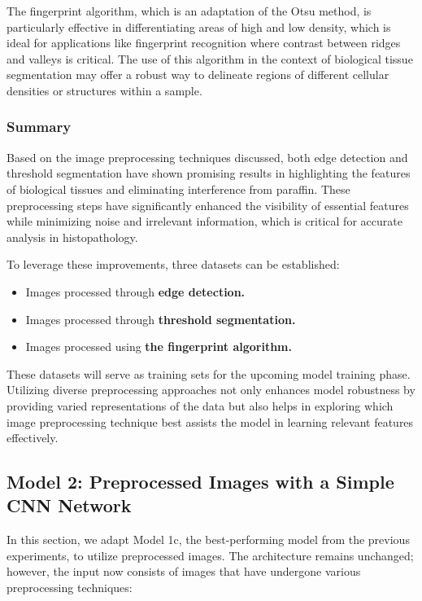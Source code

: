 The fingerprint algorithm, which is an adaptation of the Otsu method, is particularly effective in differentiating areas of high and low density, which is ideal for applications like fingerprint recognition where contrast between ridges and valleys is critical. The use of this algorithm in the context of biological tissue segmentation may offer a robust way to delineate regions of different cellular densities or structures within a sample.

\subsubsection{Summary}

Based on the image preprocessing techniques discussed, both edge detection and threshold segmentation have shown promising results in highlighting the features of biological tissues and eliminating interference from paraffin. These preprocessing steps have significantly enhanced the visibility of essential features while minimizing noise and irrelevant information, which is critical for accurate analysis in histopathology.

To leverage these improvements, three datasets can be established:

\begin{itemize}
    \item Images processed through \textbf{edge detection.}
    \item Images processed through \textbf{threshold segmentation.}
    \item Images processed using \textbf{the fingerprint algorithm.}
\end{itemize}

These datasets will serve as training sets for the upcoming model training phase. Utilizing diverse preprocessing approaches not only enhances model robustness by providing varied representations of the data but also helps in exploring which image preprocessing technique best assists the model in learning relevant features effectively.
\FloatBarrier



\subsection{Model 2: Preprocessed Images with a Simple CNN Network}

In this section, we adapt Model 1c, the best-performing model from the previous experiments, to utilize preprocessed images. The architecture remains unchanged; however, the input now consists of images that have undergone various preprocessing techniques:

